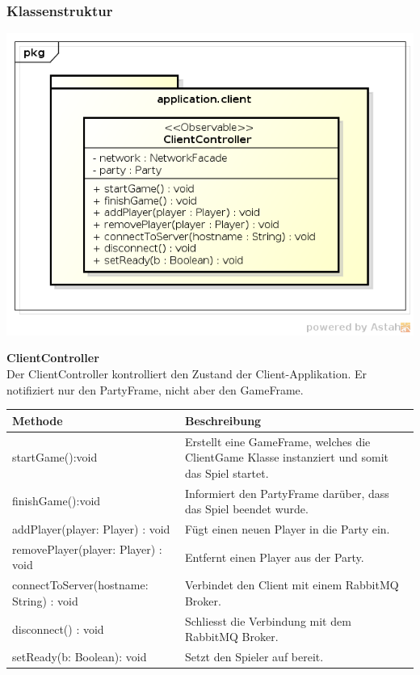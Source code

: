\documentclass[11pt]{scrartcl}
\begin{document}
\subsubsection{Klassenstruktur}
\includegraphics[scale=0.75]{ClassDiagramApplicationClient}

\textbf{ClientController}\\
Der ClientController kontrolliert den Zustand der Client-Applikation. Er notifiziert nur den PartyFrame, nicht aber den GameFrame.\\
\begin{table}[!h]
\begin{tabularx}{\linewidth}{l X}
\textbf{Methode} & \textbf{Beschreibung}\\
\hline
startGame():void & Erstellt eine GameFrame, welches die ClientGame Klasse instanziert und somit das Spiel startet.\\
finishGame():void & Informiert den PartyFrame darüber, dass das Spiel beendet wurde.\\
addPlayer(player: Player) : void & Fügt einen neuen Player in die Party ein.\\
removePlayer(player: Player) : void & Entfernt einen Player aus der Party.\\
connectToServer(hostname: String) : void & Verbindet den Client mit einem RabbitMQ Broker.\\
disconnect() : void & Schliesst die Verbindung mit dem RabbitMQ Broker.\\
setReady(b: Boolean): void & Setzt den Spieler auf bereit.\\

\end{tabularx}
\end{table}
\end{document}
